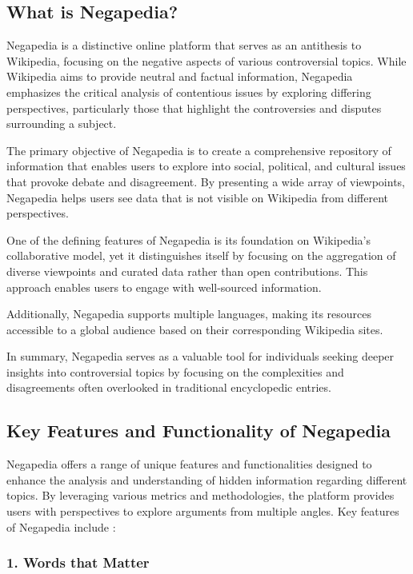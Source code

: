 \subsection{What is Negapedia?}
\label{subsec:what_is_negapedia}

Negapedia is a distinctive online platform that serves as an antithesis to Wikipedia, focusing on the negative aspects of various controversial topics. While Wikipedia aims to provide neutral and factual information, Negapedia emphasizes the critical analysis of contentious issues by exploring differing perspectives, particularly those that highlight the controversies and disputes surrounding a subject.

The primary objective of Negapedia is to create a comprehensive repository of information that enables users to explore into social, political, and cultural issues that provoke debate and disagreement. By presenting a wide array of viewpoints, Negapedia helps users see data that is not visible on Wikipedia from different perspectives.

One of the defining features of Negapedia is its foundation on Wikipedia's collaborative model, yet it distinguishes itself by focusing on the aggregation of diverse viewpoints and curated data rather than open contributions. This approach enables users to engage with well-sourced information.

Additionally, Negapedia supports multiple languages, making its resources accessible to a global audience based on their corresponding Wikipedia sites.

In summary, Negapedia serves as a valuable tool for individuals seeking deeper insights into controversial topics by focusing on the complexities and disagreements often overlooked in traditional encyclopedic entries.

\subsection{Key Features and Functionality of Negapedia}
\label{subsec:key_features_and_functionality_of_negapedia}

Negapedia offers a range of unique features and functionalities designed to enhance the analysis and understanding of hidden information regarding different topics. By leveraging various metrics and methodologies, the platform provides users with perspectives to explore arguments from multiple angles. Key features of Negapedia include \cite{negapedia_about}:

\subsubsection{1. Words that Matter}

